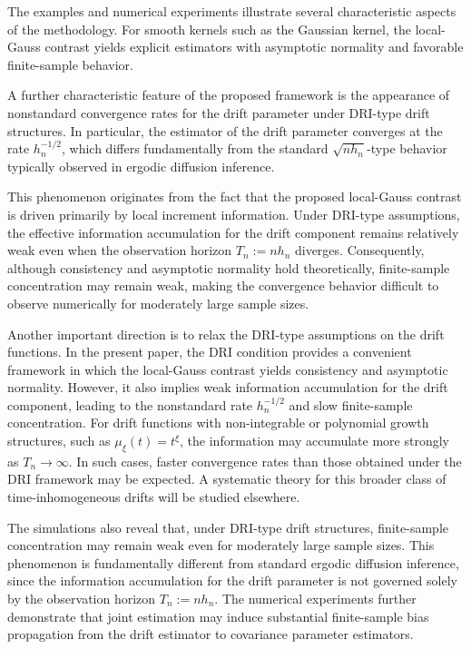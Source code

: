 \documentclass[a4paper,10pt,twoside]{article}
\numberwithin{equation}{section}
\begin{document}
The examples and numerical experiments illustrate several characteristic aspects of the methodology.
For smooth kernels such as the Gaussian kernel, the local-Gauss contrast yields explicit estimators with asymptotic normality and favorable finite-sample behavior.

A further characteristic feature of the proposed framework is the appearance of nonstandard convergence rates for the drift parameter under DRI-type drift structures. 
In particular, the estimator of the drift parameter converges at the rate $h_n^{-1/2}$,
which differs fundamentally from the standard $\sqrt{nh_n}$-type behavior typically observed in ergodic diffusion inference.

This phenomenon originates from the fact that the proposed local-Gauss contrast is driven primarily by local increment information. 
Under DRI-type assumptions, the effective information accumulation for the drift component remains relatively weak even when the observation horizon $T_n := nh_n$ diverges.
Consequently, although consistency and asymptotic normality hold theoretically,
finite-sample concentration may remain weak,
making the convergence behavior difficult to observe numerically for moderately large sample sizes.

Another important direction is to relax the DRI-type assumptions on the drift functions.
In the present paper, the DRI condition provides a convenient framework in which the local-Gauss contrast yields consistency and asymptotic normality.
However, it also implies weak information accumulation for the drift component, leading to the nonstandard rate $h_n^{-1/2}$ and slow finite-sample concentration.
For drift functions with non-integrable or polynomial growth structures, such as $\mu_\xi(t)=t^\xi$, the information may accumulate more strongly as $T_n \to \infty$.
In such cases, faster convergence rates than those obtained under the DRI framework may be expected.
A systematic theory for this broader class of time-inhomogeneous drifts will be studied elsewhere.



The simulations also reveal that, under DRI-type drift structures, finite-sample concentration may remain weak even for moderately large sample sizes.
This phenomenon is fundamentally different from standard ergodic diffusion inference, since the information accumulation for the drift parameter is not governed solely by the observation horizon $T_n := nh_n$.
The numerical experiments further demonstrate that joint estimation may induce substantial finite-sample bias propagation from the drift estimator to covariance parameter estimators.
\end{document}

